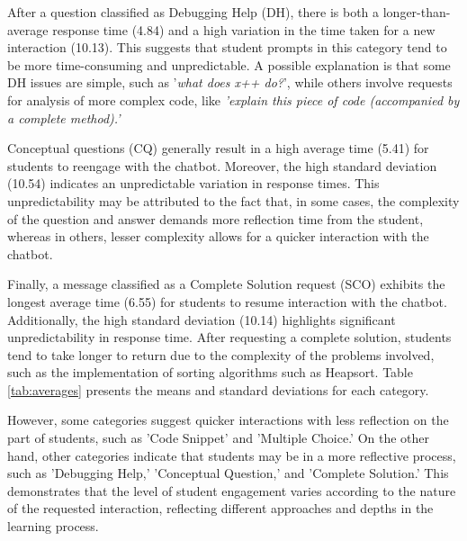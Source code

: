 \documentclass[a4paper,twoside]{article}
\begin{document}
After a question classified as Debugging Help (DH), there is both a
longer-than-average response time (4.84) and a high variation in the time taken
for a new interaction (10.13). This suggests that student prompts in this
category tend to be more time-consuming and unpredictable. A possible
explanation is that some DH issues are simple, such as '\textit{what does x++ do?}',
while others involve requests for analysis of more complex code, like
\textit{'explain this piece of code (accompanied by a complete method).'}

Conceptual questions (CQ) generally result in a high average time (5.41) for
students to reengage with the chatbot. Moreover, the high standard deviation
(10.54) indicates an unpredictable variation in response times. This
unpredictability may be attributed to the fact that, in some cases, the
complexity of the question and answer demands more reflection time from the
student, whereas in others, lesser complexity allows for a quicker interaction
with the chatbot.

Finally, a message classified as a Complete Solution request (SCO) exhibits the
longest average time (6.55) for students to resume interaction with the chatbot.
Additionally, the high standard deviation (10.14) highlights significant
unpredictability in response time. After requesting a complete solution,
students tend to take longer to return due to the complexity of the problems
involved, such as the implementation of sorting algorithms such as Heapsort. Table
\ref{tab:averages} presents the means and standard deviations for each
category.

However, some categories suggest quicker interactions with less reflection on
the part of students, such as 'Code Snippet' and 'Multiple Choice.' On the other
hand, other categories indicate that students may be in a more reflective
process, such as 'Debugging Help,' 'Conceptual Question,' and 'Complete
Solution.' This demonstrates that the level of student engagement varies
according to the nature of the requested interaction, reflecting different
approaches and depths in the learning process.
\end{document}
